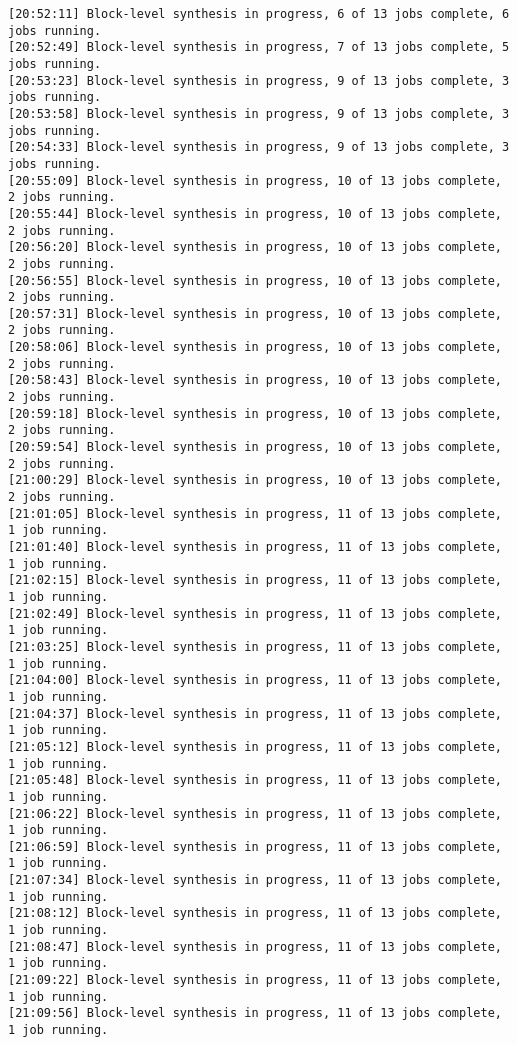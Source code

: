 \begin{lstlisting}[label=code:log_file, caption=Содержимое log-файла, basicstyle=\tiny]
[20:52:11] Block-level synthesis in progress, 6 of 13 jobs complete, 6 jobs running.
[20:52:49] Block-level synthesis in progress, 7 of 13 jobs complete, 5 jobs running.
[20:53:23] Block-level synthesis in progress, 9 of 13 jobs complete, 3 jobs running.
[20:53:58] Block-level synthesis in progress, 9 of 13 jobs complete, 3 jobs running.
[20:54:33] Block-level synthesis in progress, 9 of 13 jobs complete, 3 jobs running.
[20:55:09] Block-level synthesis in progress, 10 of 13 jobs complete, 2 jobs running.
[20:55:44] Block-level synthesis in progress, 10 of 13 jobs complete, 2 jobs running.
[20:56:20] Block-level synthesis in progress, 10 of 13 jobs complete, 2 jobs running.
[20:56:55] Block-level synthesis in progress, 10 of 13 jobs complete, 2 jobs running.
[20:57:31] Block-level synthesis in progress, 10 of 13 jobs complete, 2 jobs running.
[20:58:06] Block-level synthesis in progress, 10 of 13 jobs complete, 2 jobs running.
[20:58:43] Block-level synthesis in progress, 10 of 13 jobs complete, 2 jobs running.
[20:59:18] Block-level synthesis in progress, 10 of 13 jobs complete, 2 jobs running.
[20:59:54] Block-level synthesis in progress, 10 of 13 jobs complete, 2 jobs running.
[21:00:29] Block-level synthesis in progress, 10 of 13 jobs complete, 2 jobs running.
[21:01:05] Block-level synthesis in progress, 11 of 13 jobs complete, 1 job running.
[21:01:40] Block-level synthesis in progress, 11 of 13 jobs complete, 1 job running.
[21:02:15] Block-level synthesis in progress, 11 of 13 jobs complete, 1 job running.
[21:02:49] Block-level synthesis in progress, 11 of 13 jobs complete, 1 job running.
[21:03:25] Block-level synthesis in progress, 11 of 13 jobs complete, 1 job running.
[21:04:00] Block-level synthesis in progress, 11 of 13 jobs complete, 1 job running.
[21:04:37] Block-level synthesis in progress, 11 of 13 jobs complete, 1 job running.
[21:05:12] Block-level synthesis in progress, 11 of 13 jobs complete, 1 job running.
[21:05:48] Block-level synthesis in progress, 11 of 13 jobs complete, 1 job running.
[21:06:22] Block-level synthesis in progress, 11 of 13 jobs complete, 1 job running.
[21:06:59] Block-level synthesis in progress, 11 of 13 jobs complete, 1 job running.
[21:07:34] Block-level synthesis in progress, 11 of 13 jobs complete, 1 job running.
[21:08:12] Block-level synthesis in progress, 11 of 13 jobs complete, 1 job running.
[21:08:47] Block-level synthesis in progress, 11 of 13 jobs complete, 1 job running.
[21:09:22] Block-level synthesis in progress, 11 of 13 jobs complete, 1 job running.
[21:09:56] Block-level synthesis in progress, 11 of 13 jobs complete, 1 job running.

\end{lstlisting}
